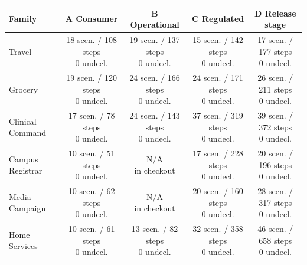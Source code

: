 \begin{tabular}{lcccc}
\toprule
Family & A Consumer & B Operational & C Regulated & D Release stage \\
\midrule
Travel & \makecell{18 scen. / 108 steps\\0 undecl.} & \makecell{19 scen. / 137 steps\\0 undecl.} & \makecell{15 scen. / 142 steps\\0 undecl.} & \makecell{17 scen. / 177 steps\\0 undecl.} \\
Grocery & \makecell{19 scen. / 120 steps\\0 undecl.} & \makecell{24 scen. / 166 steps\\0 undecl.} & \makecell{24 scen. / 171 steps\\0 undecl.} & \makecell{26 scen. / 211 steps\\0 undecl.} \\
Clinical Command & \makecell{17 scen. / 78 steps\\0 undecl.} & \makecell{24 scen. / 143 steps\\0 undecl.} & \makecell{37 scen. / 319 steps\\0 undecl.} & \makecell{39 scen. / 372 steps\\0 undecl.} \\
Campus Registrar & \makecell{10 scen. / 51 steps\\0 undecl.} & \makecell{N/A\\in checkout} & \makecell{17 scen. / 228 steps\\0 undecl.} & \makecell{20 scen. / 196 steps\\0 undecl.} \\
Media Campaign & \makecell{10 scen. / 62 steps\\0 undecl.} & \makecell{N/A\\in checkout} & \makecell{20 scen. / 160 steps\\0 undecl.} & \makecell{28 scen. / 317 steps\\0 undecl.} \\
Home Services & \makecell{10 scen. / 61 steps\\0 undecl.} & \makecell{13 scen. / 82 steps\\0 undecl.} & \makecell{32 scen. / 358 steps\\0 undecl.} & \makecell{46 scen. / 658 steps\\0 undecl.} \\
\bottomrule
\end{tabular}
